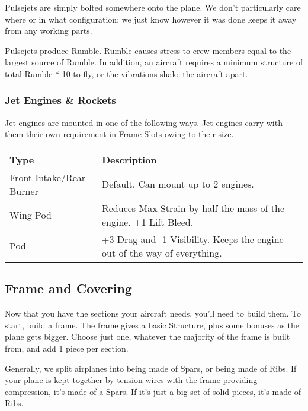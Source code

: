 \documentclass{article}
\begin{document}
Pulsejets are simply bolted somewhere onto the plane. We don't
particularly care where or in what configuration: we just know however
it was done keeps it away from any working parts.

Pulsejets produce Rumble. Rumble causes stress to crew members equal to
the largest source of Rumble. In addition, an aircraft requires a
minimum structure of total Rumble * 10 to fly, or the vibrations shake
the aircraft apart.

\subsubsection{Jet Engines \& Rockets}
\label{_Jet_Engines_\&_Rockets}

Jet engines are mounted in one of the following ways. Jet engines carry
with them their own requirement in Frame Slots owing to their size.

\begin{tabular}{|l|l|}
    \hline
    Type                     & Description                                                   \\\hline
    Front Intake/Rear Burner & Default. Can mount up to 2 engines.                           \\\hline
    Wing Pod                 & Reduces Max Strain by half the mass of the engine. +1 Lift
    Bleed.                                                                                   \\\hline
    Pod                      & +3 Drag and -1 Visibility. Keeps the engine out of the way of
    everything.                                                                              \\\hline
\end{tabular}

\subsection{Frame and Covering}
\label{_Frame_and_Covering}

Now that you have the sections your aircraft needs, you'll need to build
them. To start, build a frame. The frame gives a basic Structure, plus
some bonuses as the plane gets bigger. Choose just one, whatever the
majority of the frame is built from, and add 1 piece per section.

Generally, we split airplanes into being made of Spars, or being made of
Ribs. If your plane is kept together by tension wires with the frame
providing compression, it's made of a Spars. If it's just a big set of
solid pieces, it's made of Ribs.
\end{document}
